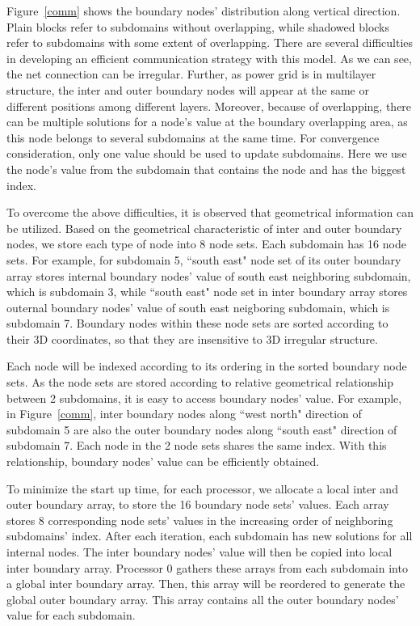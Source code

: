 \documentclass{sig-alternate}
\begin{document}
	Figure~\ref{comm} shows the boundary nodes' distribution along vertical direction. Plain blocks refer to subdomains without 
	overlapping, while shadowed blocks refer to subdomains with some extent of overlapping. There are several difficulties in 
	developing an efficient communication strategy with this model. As we can see, the net connection can be irregular. Further, 
	as power grid is in multilayer 
	structure, the inter and outer boundary nodes will appear at the same or different positions
	among different layers. Moreover, because of overlapping, there can be multiple solutions for a node's value at the boundary 
	overlapping area, as this node belongs to several subdomains at the same time. For convergence consideration, only one value 
	should be used to update subdomains. Here we use the node's value from the subdomain that contains the node and has the biggest 
	index.

	To overcome the above difficulties, it is observed that geometrical information can be utilized. Based on the geometrical 
	characteristic of inter and outer boundary nodes, we store each type of node into 8 node sets. Each subdomain has 16 node sets. 
	For example, for subdomain 5, ``south east" node set of its outer boundary array stores internal boundary nodes' value of 
	south east neighboring subdomain, which is subdomain 3, while ``south east" node set in inter boundary array stores outernal 
	boundary nodes' value of south east neigboring subdomain, which is subdomain 7. Boundary nodes within 
	these node sets are sorted according to their 3D coordinates, so that they are insensitive to 3D irregular structure. 

	Each node will be
	indexed according to its ordering in the sorted boundary node sets. As the node sets are stored according to relative geometrical 
	relationship between 2 subdomains, it is easy to access boundary nodes' value.
	For example, in Figure~\ref{comm}, inter boundary nodes along ``west north" 
	direction of subdomain 5 are also the outer boundary nodes along ``south east" direction of subdomain 7. Each node in the 
	2 node sets shares the same index. With this relationship, boundary nodes' value can be efficiently obtained.

	To minimize the start up time, for each processor, we allocate a local inter and outer boundary array, to store the 16 boundary
	node sets' values. Each array stores 8 corresponding node sets' values in the increasing order of neighboring subdomains' index. 
	After each iteration, each subdomain has new solutions for all internal nodes. The inter 
	boundary nodes' value will then be copied into local inter boundary array. Processor 0 gathers these arrays from each subdomain
	into a global inter boundary array. Then, this array will be reordered to generate the global outer boundary array. This array
	contains all the outer boundary nodes' value for each subdomain. 
\end{document}
